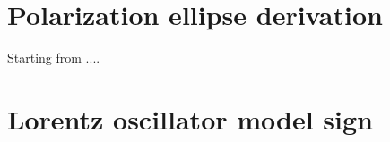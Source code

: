 \section{Polarization ellipse derivation}
\label{sec:deriv_pol_ellipse}
Starting from ....
\section{Lorentz oscillator model sign}
\label{sec:lorentz_model_sign}